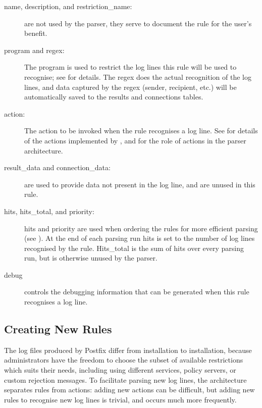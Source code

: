 \begin{description}

    \item [name, description, and restriction\_name:] are not used by the
        parser, they serve to document the rule for the user's benefit.

    \item [program and regex:] The program is used to restrict the log
        lines this rule will be used to recognise; see  for details.  The regex does the
        actual recognition of the log lines, and data captured by the regex
        (sender, recipient, etc.) will be automatically saved to the
        results and connections tables.

    \item [action:] The action to be invoked when the rule recognises a log
        line.  See  for
        details of the actions implemented by \parsername{}, and
         for the role of actions in the
        parser architecture.

    \item [result\_data and connection\_data:] are used to provide data not
        present in the log line, and are unused in this rule.

    \item [hits, hits\_total, and priority:] hits and priority are used
        when ordering the rules for more efficient parsing (see
        ).  At the end of each
        parsing run hits is set to the number of log lines recognised by
        the rule.  Hits\_total is the sum of hits over every parsing run,
        but is otherwise unused by the parser.

    \item [debug] controls the debugging information that can be generated
        when this rule recognises a log line.

\end{description}

\subsection{Creating New Rules}

\label{creating new rules in implementation}

The log files produced by Postfix differ from installation to installation,
because administrators have the freedom to choose the subset of available
restrictions which suits their needs, including using different
 services, policy servers, or custom rejection messages.  To
facilitate parsing new log lines, the architecture separates rules from
actions: adding new actions can be difficult, but adding new rules to
recognise new log lines is trivial, and occurs much more frequently.

